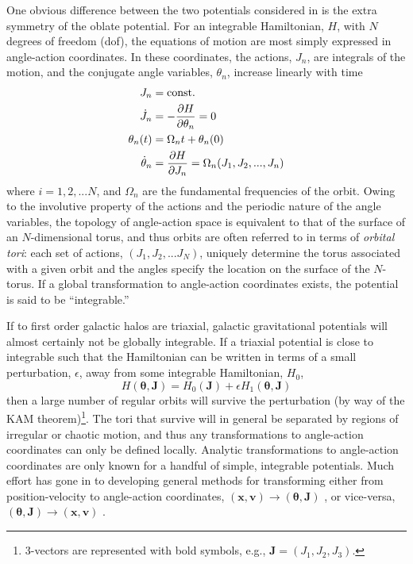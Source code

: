 \documentclass[letterpaper,12pt,preprint]{aastex}
\newcommand{\bs}[1]{\boldsymbol{#1}}
\newcommand{\act}{J}
\begin{document}
One obvious difference between the two potentials considered in \citet{pearson15} is the extra symmetry of the oblate potential. For an integrable Hamiltonian, $H$, with $N$ degrees of freedom (dof), the equations of motion are most simply expressed in angle-action coordinates. In these coordinates, the actions, $J_n$, are integrals of the motion, and the conjugate angle variables, $\theta_n$, increase linearly with time
\begin{align}
	\act_n &= {\rm const.}\\
	\dot{\act}_n &= -\frac{\partial H}{\partial \theta_n} = 0\\
	\theta_n(t) &= \Omega_n t + \theta_n(0)\\
	\dot{\theta}_n &= \frac{\partial H}{\partial \act_n} = \Omega_n(\act_1,\act_2,...,\act_n)\label{eq:aafreq}
\end{align}
where $i=1,2,...N$, and $\Omega_n$ are the fundamental frequencies of the orbit. Owing to the involutive property of the actions and the periodic nature of the angle variables, the topology of angle-action space is equivalent to that of the surface of an $N$-dimensional torus, and thus orbits are often referred to in terms of \emph{orbital tori}: each set of actions, $(\act_1,\act_2,...\act_N)$, uniquely determine the torus associated with a given orbit and the angles specify the location on the surface of the $N$-torus. If a global transformation to angle-action coordinates exists, the potential is said to be ``integrable.''

If to first order galactic halos are triaxial, galactic gravitational potentials will almost certainly not be globally integrable. If a triaxial potential is close to integrable such that the Hamiltonian can be written in terms of a small perturbation, $\epsilon$, away from some integrable Hamiltonian, $H_0$,
\begin{equation}
	H(\bs{\theta}, \bs{\act}) = H_0(\bs{\act}) + \epsilon H_1(\bs{\theta}, \bs{\act})
\end{equation}
then a large number of regular orbits will survive the perturbation (by way of the KAM theorem)\footnote{3-vectors are represented with bold symbols, e.g., $\bs{J}=(J_1,J_2,J_3)$.}. The tori that survive will in general be separated by regions of irregular or chaotic motion, and thus any transformations to angle-action coordinates can only be defined locally. Analytic transformations to angle-action coordinates are only known for a handful of simple, integrable potentials. Much effort has gone in to developing general methods for transforming either from position-velocity to angle-action coordinates, $(\bs{x},\bs{v})\rightarrow(\bs{\theta},\bs{J})$ \citep{many}, or vice-versa, $(\bs{\theta},\bs{J})\rightarrow(\bs{x},\bs{v})$ \citep{many}.
\end{document}
